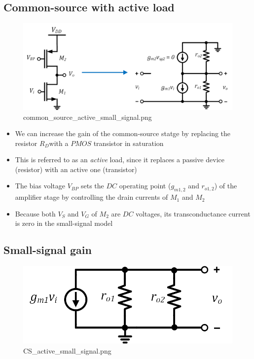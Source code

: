 \documentclass[11pt]{article}
\providecommand{\tightlist}{%
      \setlength{\itemsep}{0pt}\setlength{\parskip}{0pt}}
\begin{document}
    \hypertarget{common-source-with-active-load}{%
\subsection{Common-source with active
load}\label{common-source-with-active-load}}

    \begin{figure}
\centering
\includegraphics{common_source_active_small_signal.png}
\caption{common\_source\_active\_small\_signal.png}
\end{figure}

    \begin{itemize}
\tightlist
\item
  We can increase the gain of the common-source statge by replacing the
  resistor \(R_D\)with a \(PMOS\) transistor in saturation
\item
  This is referred to as an \emph{active} load, since it replaces a
  passive device (resistor) with an active one (transistor)
\item
  The bias voltage \(V_{BP}\) sets the \(DC\) operating point
  (\(g_{m1,2}\) and \(r_{o1,2}\)) of the amplifier stage by controlling
  the drain currents of \(M_1\) and \(M_2\)
\item
  Because both \(V_S\) and \(V_G\) of \(M_2\) are \(DC\) voltages, its
  transconductance current is zero in the small-signal model
\end{itemize}

    \hypertarget{small-signal-gain}{%
\subsection{Small-signal gain}\label{small-signal-gain}}

    \begin{figure}
\centering
\includegraphics{CS_active_small_signal.png}
\caption{CS\_active\_small\_signal.png}
\end{figure}
\end{document}
